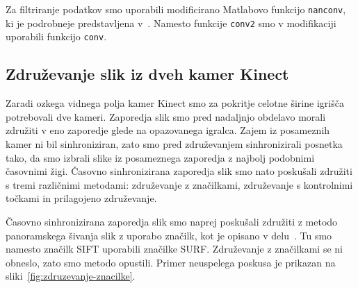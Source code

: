 Za filtriranje podatkov smo uporabili modificirano Matlabovo funkcijo \texttt{nanconv}, ki je podrobneje predstavljena v~\cite{kraus2017nanconv}. Namesto funkcije \texttt{conv2} smo v modifikaciji uporabili funkcijo \texttt{conv}.






\subsection{Združevanje slik iz dveh kamer Kinect}
Zaradi ozkega vidnega polja kamer Kinect smo za pokritje celotne širine igrišča potrebovali dve kameri. Zaporedja slik smo pred nadaljnjo obdelavo morali združiti v eno zaporedje glede na opazovanega igralca. Zajem iz posameznih kamer ni bil sinhroniziran, zato smo pred združevanjem sinhronizirali posnetka tako, da smo izbrali slike iz posameznega zaporedja z najbolj podobnimi časovnimi žigi. Časovno sinhronizirana zaporedja slik smo nato poskušali združiti s tremi različnimi metodami:  združevanje z značilkami, združevanje s kontrolnimi točkami in prilagojeno združevanje. 

Časovno sinhronizirana zaporedja slik smo naprej poskušali združiti z metodo panoramskega šivanja slik z uporabo značilk, kot je opisano v delu~\cite{brown2007automatic}. Tu smo namesto značilk SIFT uporabili značilke SURF.
Združevanje z značilkami se ni obneslo, zato smo metodo opustili. Primer neuspelega poskusa je prikazan na sliki~\ref{fig:zdruzevanje-znacilke}.

